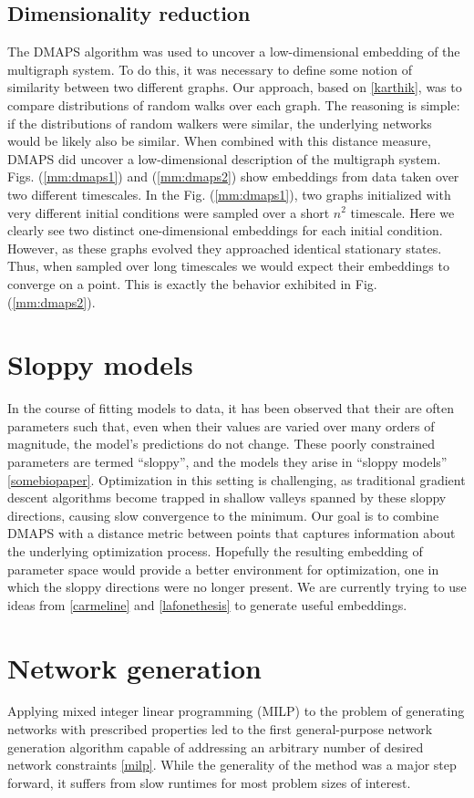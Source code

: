 \documentclass[12pt]{article}
\begin{document}
\subsection{Dimensionality reduction}
The DMAPS algorithm was used to uncover a low-dimensional embedding of the multigraph system. To do this, it was necessary to define some notion of similarity between two different graphs. Our approach, based on \ref{karthik}, was to compare distributions of random walks over each graph. The reasoning is simple: if the distributions of random walkers were similar, the underlying networks would be likely also be similar. When combined with this distance measure, DMAPS did uncover a low-dimensional description of the multigraph system. Figs. (\ref{mm:dmaps1}) and (\ref{mm:dmaps2}) show embeddings from data taken over two different timescales. In the Fig. (\ref{mm:dmaps1}), two graphs initialized with very different initial conditions were sampled over a short $n^2$ timescale. Here we clearly see two distinct one-dimensional embeddings for each initial condition. However, as these graphs evolved they approached identical stationary states. Thus, when sampled over long timescales we would expect their embeddings to converge on a point. This is exactly the behavior exhibited in Fig. (\ref{mm:dmaps2}).
\section{Sloppy models}
In the course of fitting models to data, it has been observed that their are often parameters such that, even when their values are varied over many orders of magnitude, the model's predictions do not change. These poorly constrained parameters are termed ``sloppy'', and the models they arise in ``sloppy models'' \ref{somebiopaper}. Optimization in this setting is challenging, as traditional gradient descent algorithms become trapped in shallow valleys spanned by these sloppy directions, causing slow convergence to the minimum. Our goal is to combine DMAPS with a distance metric between points that captures information about the underlying optimization process. Hopefully the resulting embedding of parameter space would provide a better environment for optimization, one in which the sloppy directions were no longer present. We are currently trying to use ideas from \ref{carmeline} and \ref{lafonethesis} to generate useful embeddings.
\section{Network generation}
Applying mixed integer linear programming (MILP) to the problem of generating networks with prescribed properties led to the first general-purpose network generation algorithm capable of addressing an arbitrary number of desired network constraints \ref{milp}. While the generality of the method was a major step forward, it suffers from slow runtimes for most problem sizes of interest. 
\end{document}
